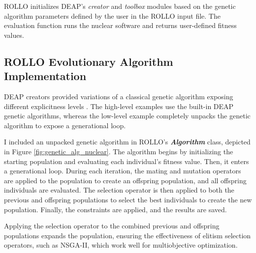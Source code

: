 \gls{ROLLO} initializes \gls{DEAP}'s \textit{creator} and \textit{toolbox} modules 
based on the genetic algorithm parameters defined by the user in the \gls{ROLLO} 
input file. 
The evaluation function runs the nuclear software and returns user-defined 
fitness values. 

\subsection{ROLLO Evolutionary Algorithm Implementation}
\gls{DEAP} creators provided variations of a classical genetic algorithm 
exposing different explicitness levels \cite{fortin_deap_2012}. 
The high-level examples use the built-in \gls{DEAP} genetic algorithms, 
whereas the low-level example completely unpacks the genetic algorithm to expose 
a generational loop. 

I included an unpacked genetic algorithm in ROLLO's 
\textbf{\textit{Algorithm}} class, depicted in Figure \ref{fig:genetic_alg_nuclear}. 
The algorithm begins by initializing the starting population and evaluating 
each individual's fitness value. 
Then, it enters a generational loop. 
During each iteration, the mating and mutation operators are applied to the population
to create an offspring population, and all offspring individuals are evaluated. 
The selection operator is then applied to both the previous and offspring populations 
to select the best individuals to create the new population. 
Finally, the constraints are applied, and the results are saved.

Applying the selection operator to the combined previous and offspring 
populations expands the population, ensuring the effectiveness of 
elitism selection operators, such as NSGA-II, which work well 
for multiobjective optimization. 


